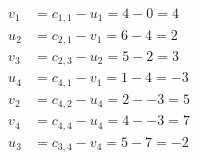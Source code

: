 \[
\begin{aligned}
v_{1} &= c_{1,1} - u_{1} = 4 - 0 = 4 \\
u_{2} &= c_{2,1} - v_{1} = 6 - 4 = 2 \\
v_{3} &= c_{2,3} - u_{2} = 5 - 2 = 3 \\
u_{4} &= c_{4,1} - v_{1} = 1 - 4 = -3 \\
v_{2} &= c_{4,2} - u_{4} = 2 - -3 = 5 \\
v_{4} &= c_{4,4} - u_{4} = 4 - -3 = 7 \\
u_{3} &= c_{3,4} - v_{4} = 5 - 7 = -2 \\
\end{aligned}
\]

